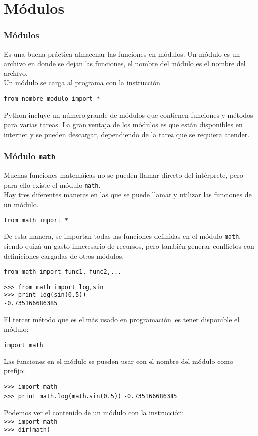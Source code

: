 \documentclass[12pt]{beamer}
\begin{document}
\section{M\'{o}dulos}
\begin{frame}[fragile]
\frametitle{M\'{o}dulos}
Es una buena pr\'{a}ctica almacenar las funciones en m\'{o}dulos. Un m\'{o}dulo es un archivo en donde se dejan las funciones, el nombre del m\'{o}dulo es el nombre del archivo.
\\
\bigskip
Un m\'{o}dulo se carga al programa con la instrucci\'{o}n
\begin{center}
\verb|from nombre_modulo import *|
\end{center}
Python incluye un n\'{u}mero grande de m\'{o}dulos que contienen funciones y m\'{e}todos para varias tareas. La gran ventaja de los m\'{o}dulos es que est\'{a}n disponibles en internet y se pueden descargar, dependiendo de la tarea que se requiera atender.
\end{frame}
\begin{frame}[fragile]
\frametitle{M\'{o}dulo \texttt{math}}
Muchas funciones matem\'{a}icas no se pueden llamar directo del int\'{e}rprete, pero para ello existe el m\'{o}dulo \texttt{math}.
\\
\bigskip
Hay tres diferentes maneras en las que se puede llamar y utilizar las funciones de un m\'{o}dulo.
\begin{exampleblock}{}
\verb|from math import *|
\end{exampleblock}
De esta manera, se importan todas las funciones definidas en el m\'{o}dulo \texttt{math}, siendo quiz\'{a} un gasto innecesario de recursos, pero tambi\'{e}n generar conflictos con definiciones cargadas de otros m\'{o}dulos.
\end{frame}
\begin{frame}[fragile]
\begin{exampleblock}{}
\verb|from math import func1, func2,...|
\end{exampleblock}
\pause
\begin{exampleblock}{}
\verb|>>> from math import log,sin| \\
\verb|>>> print log(sin(0.5))| \\
\verb|-0.735166686385|
\end{exampleblock}
\end{frame}
\begin{frame}[fragile]
El tercer m\'{e}todo que es el m\'{a}s usado en programaci\'{o}n, es tener disponible el m\'{o}dulo:
\begin{center}
\verb|import math|
\end{center}
Las funciones en el m\'{o}dulo se pueden usar con el nombre del m\'{o}dulo como prefijo:
\begin{exampleblock}{}
\verb|>>> import math| \\
\verb|>>> print math.log(math.sin(0.5))|
\verb|-0.735166686385|
\end{exampleblock}
Podemos ver el contenido de un m\'{o}dulo con la instrucci\'{o}n:
\\
\verb|>>> import math| \\
\verb|>>> dir(math)|
\end{frame}
\end{document}
